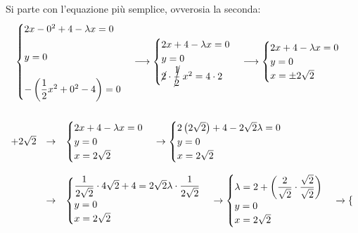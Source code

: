 \documentclass[a4paper]{article}
\begin{document}
	\noindent
	Si parte con l'equazione più semplice, ovverosia la seconda:
	\begin{gather*}
		\begin{cases}
			2x - 0^{2} + 4 - \lambda x = 0 \\
			\\
			y = 0 \\
			\\
			- \left(\dfrac{1}{2} x^{2} + 0^{2} - 4\right) = 0
		\end{cases}
		\longrightarrow
		\begin{cases}
			2x + 4 - \lambda x = 0 \\
			y = 0 \\
			\cancel{2} \cdot \cancel{\dfrac{1}{2}} \: x^{2} = 4 \cdot 2
		\end{cases}
		\longrightarrow
		\begin{cases}
			2x + 4 - \lambda x = 0 \\
			y = 0 \\
			x = \pm 2\sqrt{2}
		\end{cases}\\
		\\
		\begin{array}{rcl}
			+2\sqrt{2} &\rightarrow& \begin{cases}
				2x + 4 - \lambda x = 0 \\
				y = 0 \\
				x = 2\sqrt{2}
			\end{cases}
			\rightarrow
			\begin{cases}
				2\left(2\sqrt{2}\right) + 4 - 2\sqrt{2} \lambda = 0 \\
				y = 0 \\
				x = 2\sqrt{2}
			\end{cases} \\
			\\
			&\rightarrow&
			\begin{cases}
				\dfrac{1}{2\sqrt{2}} \cdot 4\sqrt{2} + 4 = 2\sqrt{2}\lambda \cdot \dfrac{1}{2\sqrt{2}} \\
				y = 0 \\
				x = 2\sqrt{2}
			\end{cases}
			\rightarrow
			\begin{cases}
				\lambda = 2 + \left(\dfrac{2}{\sqrt{2}} \cdot \dfrac{\sqrt{2}}{\sqrt{2}}\right) \\
				y = 0 \\
				x = 2\sqrt{2}
			\end{cases}
			\xrightarrow{}
			\begin{cases}

\end{cases}
\end{array}
\end{gather*}
\end{document}
